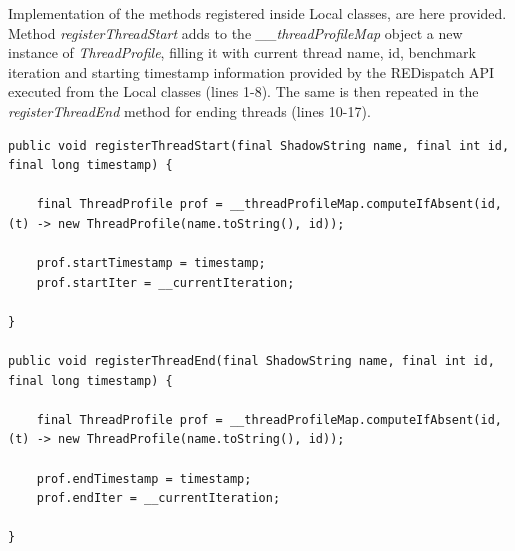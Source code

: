 \documentclass[]{usiinfthesis}
\begin{document}
    \noindent
    Implementation of the methods registered inside Local classes, are here provided. Method \textit{registerThreadStart} adds to the\textit{ \_\_threadProfileMap} object a new instance of \textit{ThreadProfile}, filling it with current thread name, id, benchmark iteration and starting timestamp information provided by the REDispatch API executed from the Local classes (lines 1-8). The same is then repeated in the \textit{registerThreadEnd} method for ending threads (lines 10-17).
    
    \vspace*{0.25cm}
        \begin{verbatim}
public void registerThreadStart(final ShadowString name, final int id, final long timestamp) {

    final ThreadProfile prof = __threadProfileMap.computeIfAbsent(id, (t) -> new ThreadProfile(name.toString(), id));

    prof.startTimestamp = timestamp;
    prof.startIter = __currentIteration;

}

public void registerThreadEnd(final ShadowString name, final int id, final long timestamp) {

    final ThreadProfile prof = __threadProfileMap.computeIfAbsent(id, (t) -> new ThreadProfile(name.toString(), id));

    prof.endTimestamp = timestamp;
    prof.endIter = __currentIteration;

}
    \end{verbatim}
    \vspace*{0.25cm}
    
\end{document}
